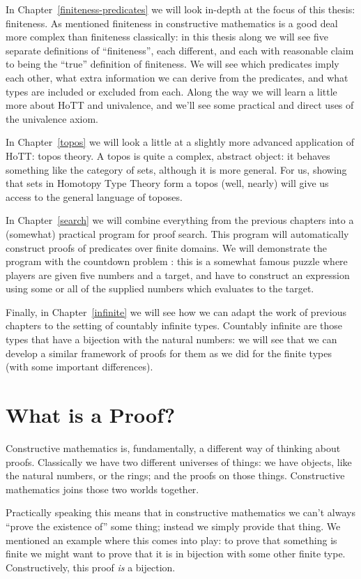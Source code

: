 In Chapter~\ref{finiteness-predicates} we will look in-depth at the focus of
this thesis: finiteness.
As mentioned finiteness in constructive mathematics is a good deal more complex
than finiteness classically:
in this thesis along we will see five separate definitions of ``finiteness'',
each different, and each with reasonable claim to being the ``true'' definition
of finiteness.
We will see which predicates imply each other, what extra information we can
derive from the predicates, and what types are included or excluded from each.
Along the way we will learn a little more about HoTT and univalence, and we'll
see some practical and direct uses of the univalence axiom.

In Chapter~\ref{topos} we will look a little at a slightly more advanced
application of HoTT: topos theory.
A topos is quite a complex, abstract object: it behaves something like the
category of sets, although it is more general.
For us, showing that sets in Homotopy Type Theory form a topos (well, nearly)
will give us access to the general language of toposes.

In Chapter~\ref{search} we will combine everything from the previous chapters
into a (somewhat) practical program for proof search.
This program will automatically construct proofs of predicates over finite
domains.
We will demonstrate the program with the countdown problem
\citep{huttonCountdownProblem2002}: this is a somewhat famous puzzle where
players are given five numbers and a target, and have to construct an expression
using some or all of the supplied numbers which evaluates to the target.

Finally, in Chapter~\ref{infinite} we will see how we can adapt the work of
previous chapters to the setting of countably infinite types.
Countably infinite are those types that have a bijection with the natural
numbers: we will see that we can develop a similar framework of proofs for them
as we did for the finite types (with some important differences).
\section{What is a Proof?}
Constructive mathematics is, fundamentally, a different way of thinking about
proofs.
Classically we have two different universes of things: we have
objects, like the natural numbers, or the rings; and the proofs on those things.
Constructive mathematics joins those two worlds together.

Practically speaking this means that in constructive mathematics we can't
always ``prove the existence of'' some thing; instead we simply provide that
thing.
We mentioned an example where this comes into play: to prove that something is
finite we might want to prove that it is in bijection with some other finite
type.
Constructively, this proof \emph{is} a bijection.

